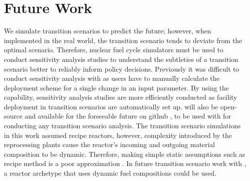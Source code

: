 \section{Future Work}
We simulate transition scenarios to predict the future; 
however, when implemented in the real world, the transition 
scenario tends to deviate from the optimal scenario.
Therefore, nuclear fuel cycle simulators must be used to conduct
sensitivity analysis studies to understand the subtleties of 
a transition scenario better to reliably inform policy decisions.
Previously it was difficult to conduct sensitivity analysis with \Cyclus 
as users have to manually calculate the deployment scheme for a 
single change in an input parameter. 
By using the \deploy capability,
sensitivity analysis studies are more efficiently 
conducted as facility deployment in transition scenarios 
are automatically set up. 
\deploy will also be open-source and available for the forseeable future on github 
\cite{chee_arfc/d3ploy:_2019}, to be used with \Cyclus for conducting any 
transition scenario analysis. 
The transition scenario simulations in this work assumed recipe reactors, 
however, complexity introduced by the reprocessing plants cause the reactor's 
incoming and outgoing material composition to be dynamic. Therefore, making simple static 
assumptions such as recipe method is a poor approximation 
\cite{bae_neural_2019,peterson-droogh_value_2018}. 
In future transition scenario work with \deploy, a \Cyclus 
reactor archetype that uses dynamic fuel compositions could be used. 
